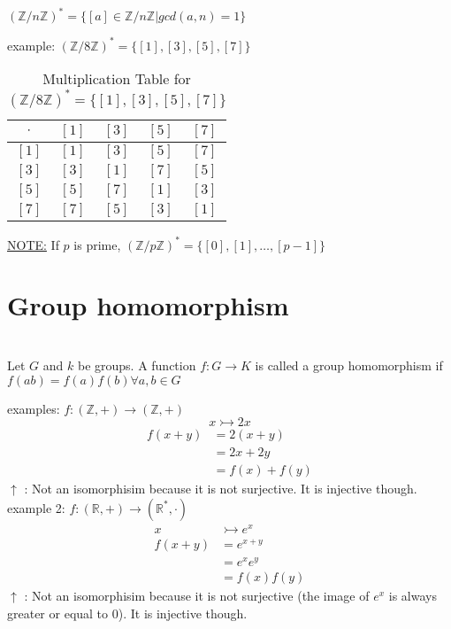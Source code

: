 \documentclass{article}
\begin{document}
    \begin{definition} \leavevmode \\ 
        $(\mathbb{Z} / n\mathbb{Z})^{*} = \{ [a] \in \mathbb{Z }/ n \mathbb{Z} | gcd(a,n) = 1\}$  
    \end{definition}
    example: $(\mathbb{Z} / 8 \mathbb{Z})^{*} = \{ [1], [3], [5], [7]\}$

        
    \begin{table}[h]
    \centering
    \begin{tabular}{|c|c|c|c|c|}
    \hline
    $\cdot$ & $[1]$ & $[3]$ & $[5]$ & $[7]$ \\
    \hline
    $[1]$ & $[1]$ & $[3]$ & $[5]$ & $[7]$ \\
    \hline
    $[3]$ & $[3]$ & $[1]$ & $[7]$ & $[5]$ \\
    \hline
    $[5]$ & $[5]$ & $[7]$ & $[1]$ & $[3]$ \\
    \hline
    $[7]$ & $[7]$ & $[5]$ & $[3]$ & $[1]$ \\
    \hline
    \end{tabular}
    \caption{Multiplication Table for $(\mathbb{Z} / 8 \mathbb{Z})^{*} = \{ [1], [3], [5], [7]\}$}
    \end{table}
    \underline{NOTE:} If $p$ is prime, $(\mathbb{Z} / p \mathbb{Z})^{*} = \{[0], [1], \dots, [p-1]\}$
\section{Group homomorphism}
    \begin{definition}[2.4.1] \leavevmode \\
        Let $G$ and $k$ be groups. A function $f: G \rightarrow K$ is called a group homomorphism if $f(ab) = f(a) f(b) \forall a,b \in G$
    \end{definition}


    examples: $f: (\mathbb{Z}, +) \rightarrow (\mathbb{Z}, +)$ 
    $$x \rightarrowtail 2x$$
    \begin{align*}
        f(x+y) &= 2(x+y) \\ 
        &= 2x + 2y \\
        &= f(x) + f(y) 
    \end{align*}
    $\uparrow$ : Not an isomorphisim because it is not surjective. It is injective though.  \\


    example 2: $f: (\mathbb{R}, +) \rightarrow (\mathbb{R}^*, \cdot)$
    \begin{align*}
        x &\rightarrowtail e^x \\ 
        f(x+y) &= e^{x+y} \\
        &= e^x e^y \\
        &= f(x) f(y)
    \end{align*}
    $\uparrow$ : Not an isomorphisim because it is not surjective (the image of $e^x$ is always greater or equal to 0). It is injective though.  \\
\end{document}
